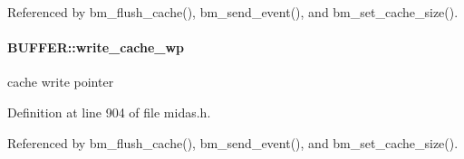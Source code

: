 Referenced by bm\_\-flush\_\-cache(), bm\_\-send\_\-event(), and bm\_\-set\_\-cache\_\-size().
\paragraph[{write\_\-cache\_\-wp}]{ {\bf BUFFER::write\_\-cache\_\-wp}}\hfill\label{structBUFFER_ac088f845fc97e9ce149b36a94644a9b4}
cache write pointer 

Definition at line 904 of file midas.h.

Referenced by bm\_\-flush\_\-cache(), bm\_\-send\_\-event(), and bm\_\-set\_\-cache\_\-size().